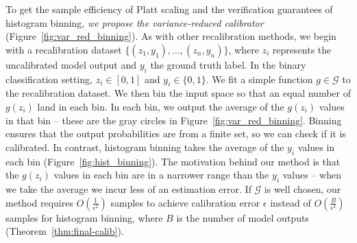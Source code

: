 To get the sample efficiency of Platt scaling and the verification guarantees of histogram binning, \emph{we propose the variance-reduced calibrator} (Figure~\ref{fig:var_red_binning}).
As with other recalibration methods, we begin with a recalibration dataset $\{(z_1, y_1), ..., (z_n, y_n)\}$, where $z_i$ represents the uncalibrated model output and $y_i$ the ground truth label.
In the binary classification setting, $z_i \in [0, 1]$ and $y_i \in \{0, 1\}$.
We fit a simple function $g \in \mathcal{G}$ to the recalibration dataset.
We then bin the input space so that an equal number of $g(z_i)$ land in each bin.
In each bin, we output the average of the $g(z_i)$ values in that bin -- these are the gray circles in Figure~\ref{fig:var_red_binning}.
Binning ensures that the output probabilities are from a finite set, so we can check if it is calibrated.
In contrast, histogram binning takes the average of the $y_i$ values in each bin (Figure~\ref{fig:hist_binning}).
The motivation behind our method is that the $g(z_i)$ values in each bin are in a narrower range than the $y_i$ values -- when we take the average we incur less of an estimation error.
If $\mathcal{G}$ is well chosen, our method requires $O(\frac{1}{\epsilon^2})$ samples to achieve calibration error $\epsilon$ instead of $O(\frac{B}{\epsilon^2})$ samples for histogram binning, where $B$ is the number of model outputs (Theorem~\ref{thm:final-calib}).



